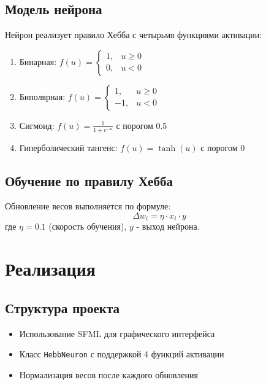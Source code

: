\documentclass{article}
\begin{document}
\subsection*{Модель нейрона}
Нейрон реализует правило Хебба с четырьмя функциями активации:
\begin{enumerate}
    \item Бинарная: \( f(u) = \begin{cases} 1, & u \geq 0 \\ 0, & u < 0 \end{cases} \)
    \item Биполярная: \( f(u) = \begin{cases} 1, & u \geq 0 \\ -1, & u < 0 \end{cases} \)
    \item Сигмоид: \( f(u) = \frac{1}{1 + e^{-u}} \) с порогом 0.5
    \item Гиперболический тангенс: \( f(u) = \tanh(u) \) с порогом 0
\end{enumerate}

\subsection*{Обучение по правилу Хебба}
Обновление весов выполняется по формуле:
\[
\Delta w_i = \eta \cdot x_i \cdot y
\]
где \( \eta = 0.1 \) (скорость обучения), \( y \) - выход нейрона.

\section*{Реализация}
\subsection*{Структура проекта}
\begin{itemize}
    \item Использование SFML для графического интерфейса
    \item Класс \texttt{HebbNeuron} с поддержкой 4 функций активации
    \item Нормализация весов после каждого обновления
\end{itemize}
\newpage
\end{document}
